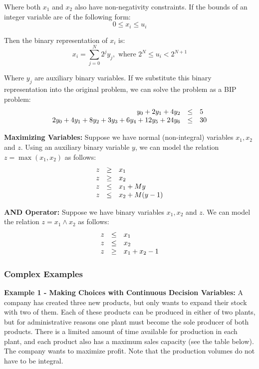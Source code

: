 \documentclass[12pt]{article}
\begin{document}
\noindent
Where both $x_1$ and $x_2$ also have non-negativity constraints.
If the bounds of an integer variable are of the following form:
\[ 0 \leq x_i \leq u_i \]

\noindent
Then the binary representation of $x_i$ is:
\[ x_i = \sum_{j = 0}^N 2^jy_j, \text{ where } 2^N \leq u_i < 2^{N + 1} \]

\noindent
Where $y_j$ are auxiliary binary variables.
If we substitute this binary representation into the original problem, we can solve the problem as a BIP problem:
\begin{align*}
    \begin{array}[t]{r c l}
        y_0 + 2y_1 + 4y_2 & \leq & 5 \\
        2y_0 + 4y_1 + 8y_2 + 3y_3 + 6y_4 + 12y_5 + 24y_6 & \leq & 30
     \end{array}
\end{align*}

\noindent
\textbf{Maximizing Variables:}
Suppose we have normal (non-integral) variables $x_1, x_2$ and $z$.
Using an auxiliary binary variable $y$, we can model the relation $z = \max(x_1, x_2)$ as follows:
\begin{align*}
    \begin{array}[t]{r c l}
        z & \geq & x_1 \\
        z & \geq & x_2 \\
        z & \leq & x_1 + My \\
        z & \leq & x_2 + M(y - 1)
     \end{array}
\end{align*}

\noindent
\textbf{AND Operator:}
Suppose we have binary variables $x_1, x_2$ and $z$.
We can model the relation $z = x_1 \land x_2$ as follows:
\begin{align*}
    \begin{array}[t]{r c l}
        z & \leq & x_1 \\
        z & \leq & x_2 \\
        z & \geq & x_1 + x_2 - 1
     \end{array}
\end{align*}

\subsubsection{Complex Examples}
\textbf{Example 1 - Making Choices with Continuous Decision Variables:}
A company has created three new products, but only wants to expand their stock with two of them.
Each of these products can be produced in either of two plants, but for administrative reasons one plant must become the sole producer of both products.
There is a limited amount of time available for production in each plant, and each product also has a maximum sales capacity (see the table below).
The company wants to maximize profit.
Note that the production volumes do not have to be integral.
\end{document}
